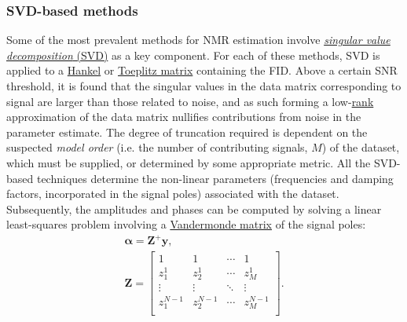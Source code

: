 \subsubsection{\acs{SVD}-based methods}
Some of the most prevalent methods for \ac{NMR} estimation involve
\ul{\emph{singular value decomposition} (SVD)}
as a key component. For each of these methods,
\ac{SVD} is applied to a \ul{Hankel} or \ul{Toeplitz matrix} containing the \ac{FID}.
Above a certain \ac{SNR} threshold, it is found that the singular values in the
data matrix corresponding to signal are larger than those related to noise, and
as such forming a low-\ul{rank} approximation of the data matrix nullifies
contributions from noise in the parameter estimate. The degree of truncation
required is dependent on the suspected \emph{model order} (i.e. the number of
contributing signals, $M$) of the dataset, which must
be supplied, or determined by some appropriate metric. All the \ac{SVD}-based
techniques determine the non-linear parameters (frequencies and
damping factors, incorporated in the signal poles) associated with the dataset.
Subsequently, the amplitudes and phases can be computed by solving a linear
least-squares problem involving a \ul{Vandermonde matrix} of the signal poles:
\begin{subequations}
    \begin{gather}
        \symbf{\alpha} = \symbf{Z}^+ \symbf{y},\\
        \symbf{Z} = \begin{bmatrix}
            1 & 1 & \cdots & 1 \\
            z_1^1 & z_2^1 & \cdots & z_M^1\\
            \vdots & \vdots & \ddots & \vdots\\
            z_1^{N-1} & z_2^{N-1} & \cdots & z_M^{N-1}\\
            \end{bmatrix}.
    \end{gather}
    \label{eq:complex-amplitudes}
\end{subequations}

